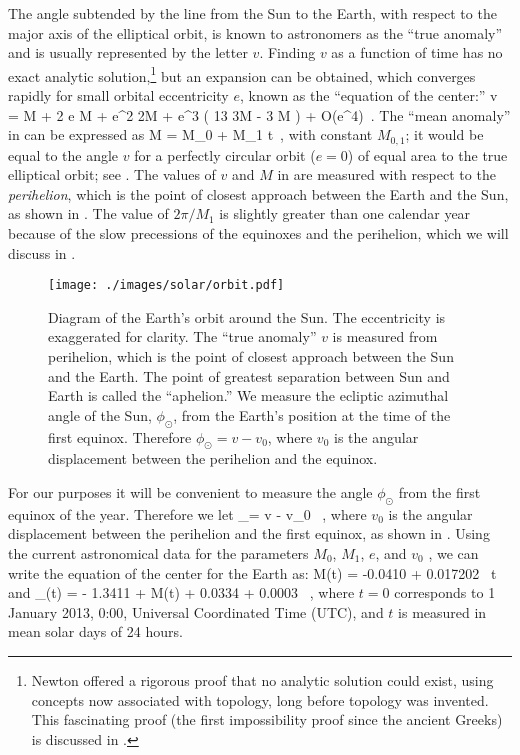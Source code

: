 The angle subtended by the line from the Sun to the Earth, with respect to the major axis of the elliptical orbit, is known to astronomers as the ``true anomaly'' and is usually represented by the letter $v$.  Finding $v$ as a function of time has no exact analytic solution,\footnote{Newton offered a rigorous proof that no analytic solution could exist, using concepts now associated with topology, long before topology was invented.  This fascinating proof (the first impossibility proof since the ancient Greeks) is discussed in \cite{Arnold,Chandra}.} but an expansion can be obtained, which converges rapidly for small orbital eccentricity $e$, known as the ``equation of the center:''
\be
v = M + 2 e \sin M +  e^2 \sin 2M +  e^3 \left( 13 \sin 3M - 3 \sin M \right) + {\cal O}(e^4)~.
\ee
The ``mean anomaly'' in  can be expressed as
\be
M = M_0 + M_1 t~,
\ee
with constant $M_{0,1}$; it would be equal to the angle $v$ for a perfectly circular orbit ($e=0$) of equal area to the true elliptical orbit; see \cite{Danby}.  The values of $v$ and $M$ in  are measured with respect to the {\it perihelion}, which is the point of closest approach between the Earth and the Sun, as shown in .  The value of $2 \pi / M_1$ is slightly greater than one calendar year because of the slow precessions of the equinoxes and the perihelion, which we will discuss in . 

\begin{figure} [htb]
\begin{center}
	\texttt{[image: ./images/solar/orbit.pdf]}
\end{center}
\caption{\small Diagram of the Earth's orbit around the Sun.  The eccentricity is exaggerated for clarity.  The ``true anomaly'' $v$ is measured from perihelion, which is the point of closest approach between the Sun and the Earth.  The point of greatest separation between Sun and Earth is called the ``aphelion.''  We measure the ecliptic azimuthal angle of the Sun, $\phi_\odot$, from the Earth's position at the time of the first equinox.  Therefore $\phi_\odot = v - v_0$, where $v_0$ is the angular displacement between the perihelion and the equinox.}
\end{figure}

For our purposes it will be convenient to measure the angle $\phi_\odot$ from the first equinox of the year.  Therefore we let
\be
\phi_\odot = v - v_0 ~,
\ee
where $v_0$ is the angular displacement between the perihelion and the first equinox, as shown in .  Using the current astronomical data for the parameters $M_0$, $M_1$, $e$, and $v_0$ \cite{orbit-parameters}, we can write the equation of the center for the Earth as:
\be
M(t) = -0.0410 + 0.017202 \, t
\ee
and
\be
\phi_\odot (t) = - 1.3411 + M(t) + 0.0334 \sin [M(t)] + 0.0003 \sin [2M(t)]~,
\ee
where $t = 0$ corresponds to 1 January 2013, 0:00, Universal Coordinated Time (UTC), and $t$ is measured in mean solar days of 24 hours.

